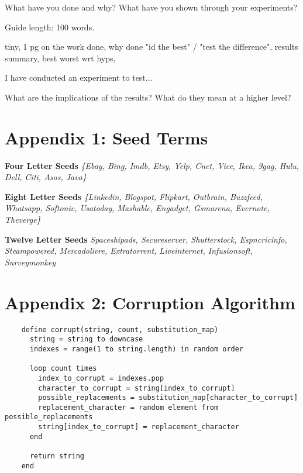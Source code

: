 \documentclass{csfourzero}
\begin{document}
What have you done and why? What have you shown through your
experiments?

Guide length: 100 words.

tiny, 1 pg on the work done, why done "id the best" / "test the difference", results summary, best worst wrt hyps,

I have conducted an experiment to test...

What are the implications of the results? What do they mean at a higher level?

\raggedbottom


\pagebreak
\raggedbottom
\section{Appendix 1: Seed Terms}
\textbf{Four Letter Seeds}
\textit{\{Ebay, Bing, Imdb, Etsy, Yelp, Cnet, Vice, Ikea, 9gag, Hulu, Dell, Citi, Asos, Java\}}

\noindent
\textbf{Eight Letter Seeds}
\textit{\{Linkedin, Blogspot, Flipkart, Outbrain, Buzzfeed, Whatsapp, Softonic, Usatoday, Mashable, Engadget, Gsmarena, Evernote, Theverge\}}

\noindent
\textbf{Twelve Letter Seeds}
\textit{{Spaceshipads, Secureserver, Shutterstock, Espncricinfo, Steampowered, Mercadolivre, Extratorrent, Liveinternet, Infusionsoft, Surveymonkey}}

\pagebreak
\raggedbottom
\section{Appendix 2: Corruption Algorithm}
  \begin{verbatim}
    define corrupt(string, count, substitution_map)
      string = string to downcase
      indexes = range(1 to string.length) in random order

      loop count times
        index_to_corrupt = indexes.pop
        character_to_corrupt = string[index_to_corrupt]
        possible_replacements = substitution_map[character_to_corrupt]
        replacement_character = random element from possible_replacements
        string[index_to_corrupt] = replacement_character
      end

      return string
    end
  \end{verbatim}

\pagebreak
\end{document}
